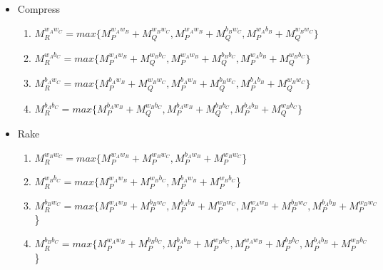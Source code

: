 \documentclass[a4paper,12pt]{article}
\begin{document}
\begin{itemize}
\item Compress
\begin{enumerate}\item $M_{R}^{ w_{A} w_{C}} = max\{M_{P}^{ w_{A} w_{B}} + M_{Q}^{ w_{B} w_{C}}, M_{P}^{ w_{A} w_{B}} + M_{Q}^{ b_{B} w_{C}}, M_{P}^{ w_{A} b_{B}} + M_{Q}^{ w_{B} w_{C}}\}$
\item $M_{R}^{ w_{A} b_{C}} = max\{M_{P}^{ w_{A} w_{B}} + M_{Q}^{ w_{B} b_{C}}, M_{P}^{ w_{A} w_{B}} + M_{Q}^{ b_{B} b_{C}}, M_{P}^{ w_{A} b_{B}} + M_{Q}^{ w_{B} b_{C}}\}$
\item $M_{R}^{ b_{A} w_{C}} = max\{M_{P}^{ b_{A} w_{B}} + M_{Q}^{ w_{B} w_{C}}, M_{P}^{ b_{A} w_{B}} + M_{Q}^{ b_{B} w_{C}}, M_{P}^{ b_{A} b_{B}} + M_{Q}^{ w_{B} w_{C}}\}$
\item $M_{R}^{ b_{A} b_{C}} = max\{M_{P}^{ b_{A} w_{B}} + M_{Q}^{ w_{B} b_{C}}, M_{P}^{ b_{A} w_{B}} + M_{Q}^{ b_{B} b_{C}}, M_{P}^{ b_{A} b_{B}} + M_{Q}^{ w_{B} b_{C}}\}$
\end{enumerate}


\item Rake
\begin{enumerate}
\item $M_{R}^{ w_{B} w_{C}} = max\{M_{P}^{ w_{A} w_{B}} + M_{P}^{ w_{B} w_{C}}, M_{P}^{ b_{A} w_{B}} + M_{P}^{ w_{B} w_{C}}$\}
\item $M_{R}^{ w_{B} b_{C}} = max\{M_{P}^{ w_{A} w_{B}} + M_{P}^{ w_{B} b_{C}}, M_{P}^{ b_{A} w_{B}} + M_{P}^{ w_{B} b_{C}}$\}
\item $M_{R}^{ b_{B} w_{C}} = max\{M_{P}^{ w_{A} w_{B}} + M_{P}^{ b_{B} w_{C}}, M_{P}^{ b_{A} b_{B}} + M_{P}^{ w_{B} w_{C}}, M_{P}^{ w_{A} w_{B}} + M_{P}^{ b_{B} w_{C}}, M_{P}^{ b_{A} b_{B}} + M_{P}^{ w_{B} w_{C}}$\}
\item $M_{R}^{ b_{B} b_{C}} = max\{M_{P}^{ w_{A} w_{B}} + M_{P}^{ b_{B} b_{C}}, M_{P}^{ b_{A} b_{B}} + M_{P}^{ w_{B} b_{C}}, M_{P}^{ w_{A} w_{B}} + M_{P}^{ b_{B} b_{C}}, M_{P}^{ b_{A} b_{B}} + M_{P}^{ w_{B} b_{C}}$\}
\end{enumerate}
\end{itemize}
\end{document}
